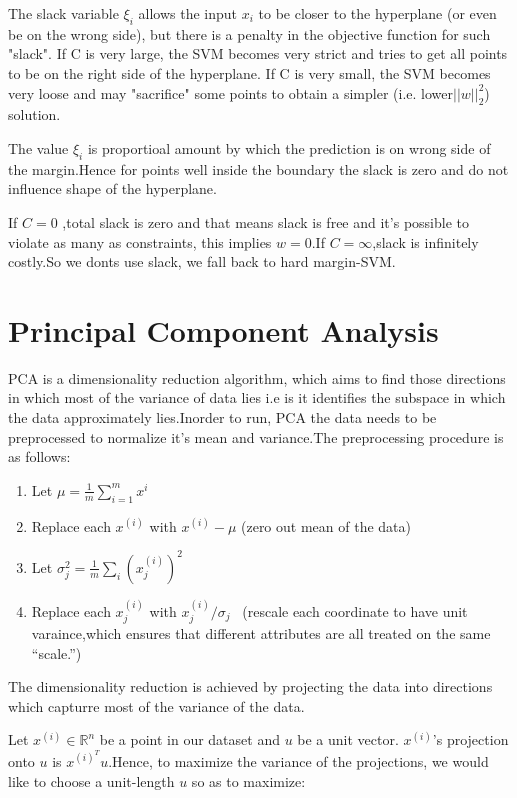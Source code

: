 \documentclass[12pt]{article}
\begin{document}
 The slack variable $\xi_{i}$ allows the input $x_{i}$ to be closer to the hyperplane (or even be on the wrong side), but there is a penalty in the objective function for such "slack". If C is very large, the SVM becomes very strict and tries to get all points to be on the right side of the hyperplane. If C is very small, the SVM becomes very loose and may "sacrifice" some points to obtain a simpler (i.e. lower$ \vert \vert w \vert \vert_{2} ^{2}$) solution. 
 
 The value $\xi_{i}$ is proportioal amount by which the prediction is on wrong side of the margin.Hence for points well inside the boundary the slack is zero and do not influence shape of the hyperplane.
 
 If $C =0 $ ,total slack is zero and that means slack is free and it's possible to violate as many as constraints, this implies $w = 0$.If $C = \infty$,slack is infinitely costly.So we donts use slack, we fall back to hard margin-SVM. 
 
 \section{Principal Component Analysis}
PCA is a dimensionality reduction algorithm, which aims to find those directions in which most of the variance of data lies i.e is it  identifies the subspace in which the data approximately lies.Inorder to run, PCA the data needs to be preprocessed to normalize it's mean and variance.The preprocessing procedure is as follows:

\begin{enumerate}
	\item Let $\mu  = \frac{1}{m} \sum_{i=1}^{m}x^{i}$
	\item Replace each $x^{(i)}$ with $x^{(i)}-\mu$ (zero out mean of the data)
	\item Let $\sigma _{j}^{2} = \frac{1}{m} \sum_{i}(x_{j}^{(i)})^{2}$
	\item  Replace each $x_{j}^{(i)}$ with $x_{j}^{(i)} /  \sigma_{j}$ \ (rescale each coordinate to have unit varaince,which ensures that different attributes are all treated on the same
	“scale.”)
\end{enumerate}

The dimensionality reduction is achieved by projecting the data into directions which capturre most of the variance of the data.

Let $x^{(i)} \in \mathbb{R}^{n}$ be a point in our dataset and $u$ be a unit vector. $x^{(i)}$'s projection onto $u$ is $x^{(i)^T}u$.Hence, to maximize the variance of the projections, we would like to choose a unit-length $u$ so as to maximize:
 
\end{document}

